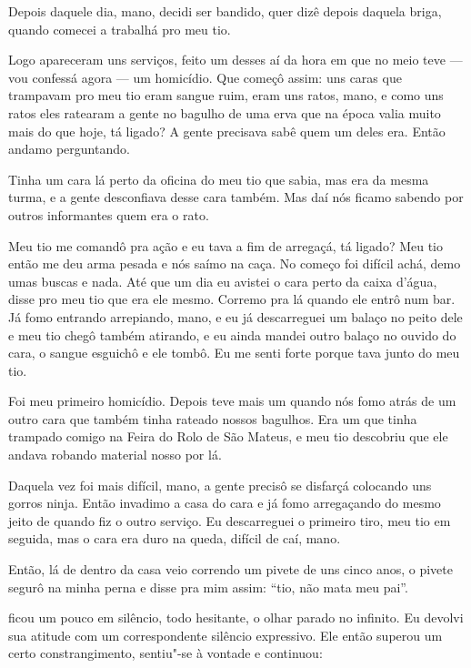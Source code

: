 Depois daquele dia, mano, decidi ser bandido, quer dizê depois daquela
briga, quando comecei a trabalhá pro meu tio.

Logo apareceram uns serviços, feito um desses aí da hora em que no meio
teve --- vou confessá agora --- um homicídio. Que começô assim: uns
caras que trampavam pro meu tio eram sangue ruim, eram uns ratos, mano,
e como uns ratos eles ratearam a gente no bagulho de uma erva que na
época valia muito mais do que hoje, tá ligado? A gente precisava sabê
quem um deles era. Então andamo perguntando.

Tinha um cara lá perto da oficina do meu tio que sabia, mas era da mesma
turma, e a gente desconfiava desse cara também. Mas daí nós ficamo
sabendo por outros informantes quem era o rato.

Meu tio me comandô pra ação e eu tava a fim de arregaçá, tá ligado? Meu
tio então me deu arma pesada e nós saímo na caça. No começo foi difícil
achá, demo umas buscas e nada. Até que um dia eu avistei o cara perto da
caixa d'água, disse pro meu tio que era ele mesmo. Corremo pra lá quando
ele entrô num bar. Já fomo entrando arrepiando, mano, e eu já
descarreguei um balaço no peito dele e meu tio chegô também atirando, e
eu ainda mandei outro balaço no ouvido do cara, o sangue esguichô e ele
tombô. Eu me senti forte porque tava junto do meu tio.

Foi meu primeiro homicídio. Depois teve mais um quando nós fomo atrás de
um outro cara que também tinha rateado nossos bagulhos. Era um que tinha
trampado comigo na Feira do Rolo de São Mateus, e meu tio descobriu que
ele andava robando material nosso por lá.

Daquela vez foi mais difícil, mano, a gente precisô se disfarçá
colocando uns gorros ninja. Então invadimo a casa do cara e já fomo
arregaçando do mesmo jeito de quando fiz o outro serviço. Eu
descarreguei o primeiro tiro, meu tio em seguida, mas o cara era duro na
queda, difícil de caí, mano.

Então, lá de dentro da casa veio correndo um pivete de uns cinco anos, o
pivete segurô na minha perna e disse pra mim assim: ``tio, não mata meu
pai''.

\asterisc{}

 ficou um pouco em silêncio, todo hesitante, o olhar parado no
infinito. Eu devolvi sua atitude com um correspondente silêncio
expressivo. Ele então superou um certo constrangimento, sentiu"-se à
vontade e continuou:

\asterisc{}

